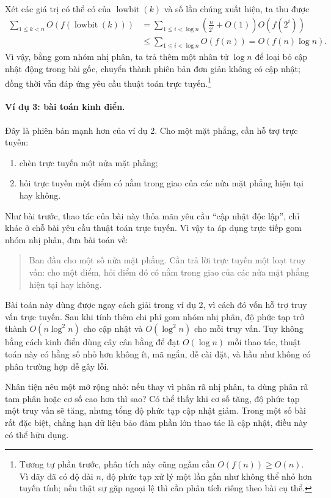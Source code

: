 \documentclass[11pt]{article}
\begin{document}
Xét các giá trị có thể có của \(\operatorname{lowbit}(k)\) và số lần chúng
xuất hiện, ta thu được
\[
\begin{aligned}
\sum_{1\le k<n} O(f(\operatorname{lowbit}(k)))
  &= \sum_{1\le i<\log n}
       \left(\frac{n}{2^i}+O(1)\right)O(f(2^i))\\
  &\le \sum_{1\le i<\log n} O(f(n))
   = O(f(n)\log n).
\end{aligned}
\]
Vì vậy, bằng gom nhóm nhị phân, ta trả thêm một nhân tử \(\log n\) để loại
bỏ cập nhật động trong bài gốc, chuyển thành phiên bản đơn giản không có cập
nhật; đồng thời vẫn đáp ứng yêu cầu thuật toán trực tuyến.\footnote{Tương tự
phần trước, phân tích này cũng ngầm cần \(O(f(n))\ge O(n)\). Vì dãy đã có độ
dài \(n\), độ phức tạp xử lý một lần gần như không thể nhỏ hơn tuyến tính;
nếu thật sự gặp ngoại lệ thì cần phân tích riêng theo bài cụ thể.}

\paragraph{Ví dụ 3: bài toán kinh điển.}
Đây là phiên bản mạnh hơn của ví dụ 2. Cho một mặt phẳng, cần hỗ trợ trực
tuyến:
\begin{enumerate}
  \item chèn trực tuyến một nửa mặt phẳng;
  \item hỏi trực tuyến một điểm có nằm trong giao của các nửa mặt phẳng hiện
  tại hay không.
\end{enumerate}

Như bài trước, thao tác của bài này thỏa mãn yêu cầu ``cập nhật độc lập'',
chỉ khác ở chỗ bài yêu cầu thuật toán trực tuyến. Vì vậy ta áp dụng trực
tiếp gom nhóm nhị phân, đưa bài toán về:
\begin{quote}
Ban đầu cho một số nửa mặt phẳng. Cần trả lời trực tuyến một loạt truy vấn:
cho một điểm, hỏi điểm đó có nằm trong giao của các nửa mặt phẳng hiện tại
hay không.
\end{quote}

Bài toán này dùng được ngay cách giải trong ví dụ 2, vì cách đó vốn hỗ trợ
truy vấn trực tuyến. Sau khi tính thêm chi phí gom nhóm nhị phân, độ phức
tạp trở thành \(O(n\log^2 n)\) cho cập nhật và \(O(\log^2 n)\) cho mỗi truy
vấn. Tuy không bằng cách kinh điển dùng cây cân bằng để đạt \(O(\log n)\)
mỗi thao tác, thuật toán này có hằng số nhỏ hơn không ít, mã ngắn, dễ cài
đặt, và hầu như không có phân trường hợp dễ gây lỗi.

Nhân tiện nêu một mở rộng nhỏ: nếu thay vì phân rã nhị phân, ta dùng phân rã
tam phân hoặc cơ số cao hơn thì sao? Có thể thấy khi cơ số tăng, độ phức tạp
một truy vấn sẽ tăng, nhưng tổng độ phức tạp cập nhật giảm. Trong một số bài
rất đặc biệt, chẳng hạn dữ liệu bảo đảm phần lớn thao tác là cập nhật, điều
này có thể hữu dụng.
\end{document}
